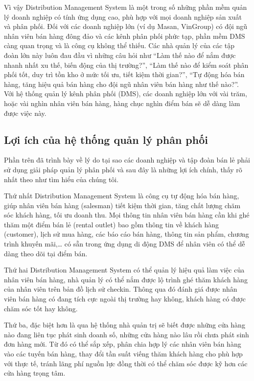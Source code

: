 Vì vậy Distribution Management System là một trong số những
phần mềm quản lý doanh nghiệp có tính ứng dụng cao, phù hợp với mọi
doanh nghiệp sản xuất và phân phối. Đối với các doanh nghiệp lớn
(ví dụ Masan, VinGroup) có đội ngũ nhân viên bán hàng đông đảo và các
kênh phân phối phức tạp, phần mềm DMS càng quan trọng và là công cụ không
thể thiếu. Các nhà quản lý của các tập đoàn lớn này luôn đau đầu vì
những câu hỏi như “Làm thế nào để nắm được nhanh nhất xu thế, biến động
của thị trường?”, “Làm thế nào để kiểm soát phân phối tốt, duy
trì tồn kho ở mức tối ưu, tiết kiệm thời gian?”, “Tự động hóa bán
hàng, tăng hiệu quả bán hàng cho đội ngũ nhân viên bán hàng như
thế nào?”. Với hệ thống quản lý kênh phân phối (DMS), các doanh nghiệp
lớn với vài trăm, hoặc vài nghìn nhân viên bán hàng, hàng chục
nghìn điểm bán sẽ dễ dàng làm được việc này.

\subsection{Lợi ích của hệ thống quản lý phân phối}
Phần trên đã trình bày về lý do tại sao các doanh nghiệp và tập
đoàn bán lẻ phải sử dụng giải pháp quản lý phân phối và sau đây
là những lợi ích chính, thấy rõ nhất theo như tìm hiểu của chúng tôi.

Thứ nhất Distribution Management System là công cụ tự động hóa
bán hàng, giúp nhân viên bán hàng (salesman) tiết kiệm thời gian,
tăng chất lượng chăm sóc khách hàng, tối ưu doanh thu. Mọi thông
tin nhân viên bán hàng cần khi ghé thăm một điểm bán lẻ (rental outlet) 
bao gồm thông tin về khách hàng (customer), lịch sử mua hàng, 
các báo cáo bán hàng, thông tin sản phẩm, chương trình khuyến mãi,… 
có sẵn trong ứng dụng di động DMS để nhân viên có thể dễ dàng theo
dõi tại điểm bán.

Thứ hai Distribution Management System có thể quản lý hiệu quả
làm việc của nhân viên bán hàng, nhà quản lý có thể nắm được lộ
trình ghé thăm khách hàng của nhân viên trên bản đồ lịch sử checkin.
Thông qua đó đánh giá được nhân viên bán hàng có đang tích cực
ngoài thị trường hay không, khách hàng có được chăm sóc tốt hay không.

Thứ ba, đặc biệt hơn là qua hệ thống nhà quản trị sẽ biết
được những cửa hàng nào đang liên tục phát sinh doanh số, những cửa hàng
nào lâu rồi chưa phát sinh đơn hàng mới. Từ đó có thể sắp xếp,
phân chia hợp lý các nhân viên bán hàng vào các tuyến bán
hàng, thay đổi tần suất viếng thăm khách hàng cho phù hợp với
thực tế, tránh lãng phí nguồn lực đồng thời có thể chăm sóc được kỹ
hơn các cửa hàng trọng tâm.

